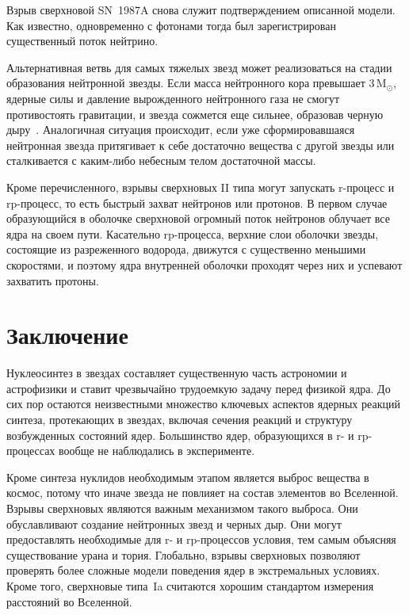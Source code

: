 \documentclass[a4paper, 14pt]{extarticle}
\def\M{\mathrm{M}_\odot}
\begin{document}
Взрыв сверхновой SN~1987A снова служит подтверждением описанной модели. 
Как известно, одновременно с фотонами тогда был зарегистрирован 
существенный поток нейтрино.

Альтернативная ветвь для самых тяжелых звезд может реализоваться на 
стадии образования нейтронной звезды. Если масса нейтронного кора 
превышает $3\,\M$, ядерные силы и давление вырожденного нейтронного газа 
не смогут противостоять гравитации, и звезда сожмется еще сильнее, 
образовав черную дыру~\cite{neutron-to-black}. Аналогичная ситуация 
происходит, если уже сформировавшаяся нейтронная звезда притягивает 
к себе достаточно вещества с другой звезды или сталкивается с каким-либо 
небесным телом достаточной массы.

Кроме перечисленного, взрывы сверхновых II типа могут запускать 
r-процесс и rp-процесс, то есть быстрый захват нейтронов или протонов. 
В первом случае образующийся в оболочке сверхновой огромный поток 
нейтронов облучает все ядра на своем пути. Касательно rp-процесса, 
верхние слои оболочки звезды, состоящие из разреженного водорода, 
движутся с существенно меньшими скоростями, и поэтому ядра внутренней 
оболочки проходят через них и успевают захватить протоны.



\section{Заключение}

Нуклеосинтез в звездах составляет существенную часть астрономии 
и астрофизики и ставит чрезвычайно трудоемкую задачу перед физикой ядра. 
До сих пор остаются неизвестными множество ключевых аспектов ядерных 
реакций синтеза, протекающих в звездах, включая сечения реакций 
и структуру возбужденных состояний ядер. Большинство ядер, образующихся 
в r- и rp-процессах вообще не наблюдались в эксперименте.

Кроме синтеза нуклидов необходимым этапом является выброс вещества 
в космос, потому что иначе звезда не повлияет на состав элементов во 
Вселенной. Взрывы сверхновых являются важным механизмом такого выброса. 
Они обуславливают создание нейтронных звезд и черных дыр. Они могут 
предоставлять необходимые для r- и rp-процессов условия, тем самым 
объясняя существование урана и тория. Глобально, взрывы сверхновых 
позволяют проверять более сложные модели поведения ядер в экстремальных 
условиях. Кроме того, сверхновые типа~Ia считаются хорошим стандартом 
измерения расстояний во Вселенной.
\end{document}
